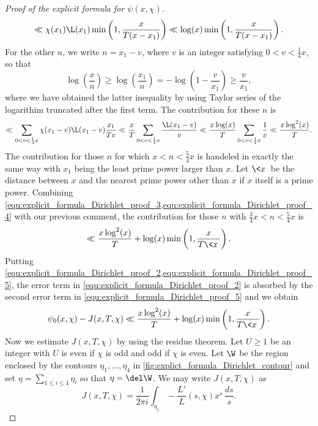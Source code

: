 \begin{proof}[Proof of the explicit formula for $\psi(x,\chi)$]
\begin{equation}
          \ll \chi(x_{1})\L(x_{1})\min\left(1,\frac{x}{T(x-x_{1})}\right) \ll \log(x)\min\left(1,\frac{x}{T(x-x_{1})}\right).
        \end{equation}
        For the other $n$, we write $n = x_{1}-v$, where $v$ is an integer satisfying $0 < v < \frac{1}{4}x$, so that
        \[
          \log\left(\frac{x}{n}\right) \ge \log\left(\frac{x_{1}}{n}\right) = -\log\left(1-\frac{v}{x_{1}}\right) \ge \frac{v}{x_{1}},
        \]
        where we have obtained the latter inequality by using Taylor series of the logarithim truncated after the first term. The contribution for these $n$ is
        \begin{equation}\label{equ:explicit_formula_Dirichlet_proof_4}
          \ll \sum_{0 < v < \frac{1}{4}x}\chi(x_{1}-v)\L(x_{1}-v)\frac{x_{1}}{Tv} \ll \frac{x}{T}\sum_{0 < v < \frac{1}{4}x}\frac{\L(x_{1}-v)}{v} \ll \frac{x\log(x)}{T}\sum_{0 < v < \frac{1}{4}x}\frac{1}{v} \ll \frac{x\log^{2}(x)}{T}.
        \end{equation}
        The contribution for those $n$ for which $x < n < \frac{5}{4}x$ is handeled in exactly the same way with $x_{1}$ being the least prime power larger than $x$. Let $\<x\>$ be the distance between $x$ and the nearest prime power other than $x$ if $x$ itself is a prime power. Combining \cref{equ:explicit_formula_Dirichlet_proof_3,equ:explicit_formula_Dirichlet_proof_4} with our previous comment, the contribution for those $n$ with $\frac{3}{4}x < n < \frac{5}{4}x$ is
        \begin{equation}\label{equ:explicit_formula_Dirichlet_proof_5}
          \ll \frac{x\log^{2}(x)}{T}+\log(x)\min\left(1,\frac{x}{T\<x\>}\right).
        \end{equation}
        Putting \cref{equ:explicit_formula_Dirichlet_proof_2,equ:explicit_formula_Dirichlet_proof_5}, the error term in \cref{equ:explicit_formula_Dirichlet_proof_2} is absorbed by the second error term in \cref{equ:explicit_formula_Dirichlet_proof_5} and we obtain
        \begin{equation}\label{equ:explicit_formula_Dirichlet_proof_6}
          \psi_{0}(x,\chi)-J(x,T,\chi) \ll \frac{x\log^{2}(x)}{T}+\log(x)\min\left(1,\frac{x}{T\<x\>}\right).
        \end{equation}
        Now we estimate $J(x,T,\chi)$ by using the residue theorem. Let $U \ge 1$ be an integer with $U$ is even if $\chi$ is odd and odd if $\chi$ is even. Let $\W$ be the region enclosed by the contours $\eta_{1},\ldots,\eta_{4}$ in \cref{fig:explict_formula_Dirichlet_contour} and set $\eta = \sum_{1 \le i \le 4}\eta_{i}$ so that $\eta = \del \W$. We may write $J(x,T,\chi)$ as
        \[
          J(x,T,\chi) = \frac{1}{2\pi i}\int_{\eta_{1}}-\frac{L'}{L}(s,\chi)x^{s}\,\frac{ds}{s}.
        \]


\end{proof}
